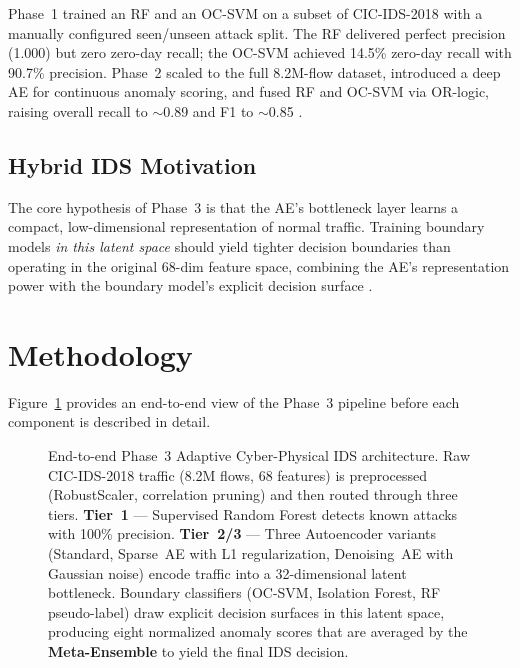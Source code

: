 \documentclass[10pt,conference]{IEEEtran}
\begin{document}
Phase~1 trained an RF and an OC-SVM on a subset of CIC-IDS-2018 with a
manually configured seen/unseen attack split.  The RF delivered perfect
precision (1.000) but zero zero-day recall; the OC-SVM achieved 14.5\%
zero-day recall with 90.7\% precision.  Phase~2 scaled to the full
8.2M-flow dataset, introduced a deep AE for continuous anomaly scoring,
and fused RF and OC-SVM via OR-logic, raising overall recall to
$\sim$0.89 and F1 to $\sim$0.85 \cite{chandola2009, buczak2016}.

\subsection{Hybrid IDS Motivation}

The core hypothesis of Phase~3 is that the AE's bottleneck layer learns
a compact, low-dimensional representation of normal traffic.  Training
boundary models \emph{in this latent space} should yield tighter
decision boundaries than operating in the original 68-dim feature space,
combining the AE's representation power with the boundary model's
explicit decision surface \cite{hinton2006, pmc2023}.

\section{Methodology}
\label{sec:method}

Figure~\ref{fig:arch_overview} provides an end-to-end view of the
Phase~3 pipeline before each component is described in detail.

\begin{figure}[t!]
\centering

\caption{End-to-end Phase~3 Adaptive Cyber-Physical IDS architecture.
  Raw CIC-IDS-2018 traffic (8.2M flows, 68 features) is preprocessed
  (RobustScaler, correlation pruning) and then routed through three tiers.
  \textbf{Tier~1} — Supervised Random Forest detects known attacks with
  100\% precision.  \textbf{Tier~2/3} — Three Autoencoder variants
  (Standard, Sparse~AE with L1 regularization, Denoising~AE with
  Gaussian noise) encode traffic into a 32-dimensional latent bottleneck.
  Boundary classifiers (OC-SVM, Isolation Forest, RF pseudo-label) draw
  explicit decision surfaces in this latent space, producing eight
  normalized anomaly scores that are averaged by the \textbf{Meta-Ensemble}
  to yield the final IDS decision.}
\label{fig:arch_overview}
\end{figure}
\end{document}
